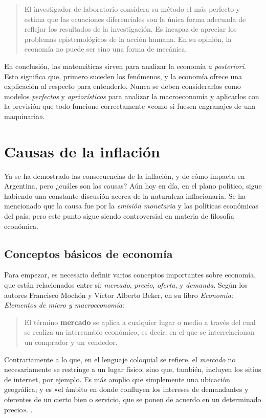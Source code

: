 \documentclass[12pt,a4paper,twoside]{book}
\begin{document}
\begin{quotation}
El investigador de laboratorio considera su método el más perfecto y estima que las ecuaciones diferenciales son la única forma adecuada de reflejar los resultados de la investigación. Es incapaz de apreciar los problemas epistemológicos de la acción humana. En su opinión, la economía no puede ser sino una forma de mecánica. \cite[págs. 8-9]{mises:lah}
\end{quotation}

En conclusión, las matemáticas sirven para analizar la economía \textit{a posteriori}. Esto significa que, primero suceden los fenómenos, y la economía ofrece una explicación al respecto para entenderlo. Nunca se deben considerarlos como modelos \textit{perfectos} y \textit{apriorísticos} para analizar la macroeconomía y aplicarlos con la previsión que todo funcione correctamente «como si fuesen engranajes de una maquinaria». 

\section{Causas de la inflación}
Ya se ha demostrado las consecuencias de la inflación, y de cómo impacta en Argentina, pero ¿cuáles son las causas? Aún hoy en día, en el plano político, sigue habiendo una constante discusión acerca de la naturaleza inflacionaria. Se ha mencionado que la causa fue por la \textit{emisión monetaria} y las políticas económicas del país; pero este punto sigue siendo controversial en materia de filosofía económica.

\subsection{Conceptos básicos de economía}
Para empezar, es necesario definir varios conceptos importantes sobre economía, que están relacionados entre sí: \textit{mercado}, \textit{precio}, \textit{oferta}, y \textit{demanda}. Según los autores Francisco Mochón y Víctor Alberto Beker, en su libro \textit{Economía: Elementos de micro y macroeconomía}:

\begin{quotation}
El término \textbf{mercado} se aplica a cualquier lugar o medio a través del cual se realiza un intercambio económico, es decir, en el que se interrelacionan un comprador y un vendedor. \cite[pág. 86]{mochobeker}
\end{quotation}

Contrariamente a lo que, en el lenguaje coloquial se refiere, el \textit{mercado} no necesariamente se restringe a un lugar físico; sino que, también, incluyen los sitios de internet, por ejemplo. Es más amplio que simplemente una ubicación geográfica; y es «el ámbito en donde confluyen los intereses de demandantes y oferentes de un cierto bien o servicio, que se ponen de acuerdo en un determinado precio». \cite[pág. 85]{mochobeker}.
\end{document}

